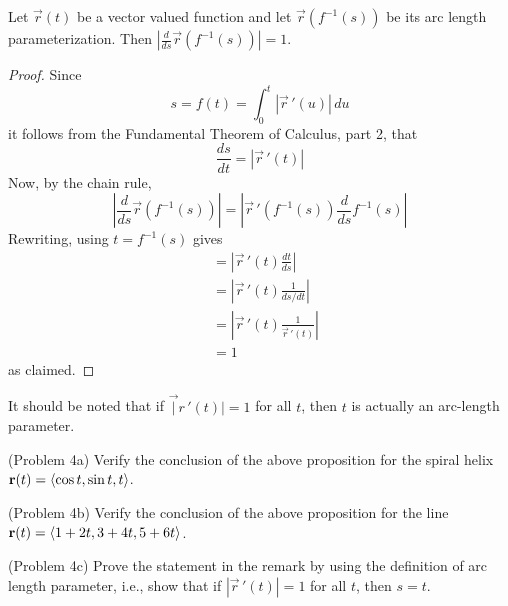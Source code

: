 \documentclass[handout]{ximera}
\begin{document}
\begin{proposition}
Let $\vec r(t)$ be a vector valued function and let $\vec r(f^{-1}(s))$ be its arc length parameterization.
Then $\left| \frac{d}{ds} \vec r(f^{-1}(s))\right| = 1$.\\
\end{proposition}
\begin{proof}
Since 
\[
s = f(t) = \int_0^t |\vec r \,'(u)|\, du
\]
it follows from the Fundamental Theorem of Calculus, part 2, that
\[
\frac{ds}{dt} = |\vec r \,'(t)|
\]
Now, by the chain rule,
\[
 \left| \frac{d}{ds} \vec r(f^{-1}(s)) \right| = \left|\vec r\,'(f^{-1}(s)) \frac{d}{ds} f^{-1}(s)\right|
 \]
 Rewriting, using $t = f^{-1}(s)$ gives
 \begin{align*}
 &= \left|\vec r\,'(t) \frac{dt}{ds} \right|\\
 &= \left|\vec r\,'(t) \frac{1}{ds/dt} \right|\\
 &=\left|\vec r\,'(t) \frac{1}{\vec r\,'(t)} \right| \\
 &= 1
\end{align*}
as claimed.
\end{proof}

\begin{remark}
It should be noted that if $\vec |r\,'(t)| = 1$ for all $t$, then $t$ is actually an arc-length parameter.
\end{remark}


\begin{problem}(Problem 4a)
Verify the conclusion of the above proposition for the spiral helix $\mathbf r(t) = \left\langle \cos t, \sin t, t\right\rangle$.
\end{problem}

\begin{problem}(Problem 4b)
Verify the conclusion of the above proposition for the line $\mathbf r(t) = \left\langle 1+2t, 3+4t, 5+6t\right\rangle$.
\end{problem}

\begin{problem}(Problem 4c)
Prove the statement in the remark by using the definition of arc length parameter, i.e., show that if
$|\vec r\,'(t)|=1$ for all $t$, then $s = t$.
\end{problem}
\end{document}
